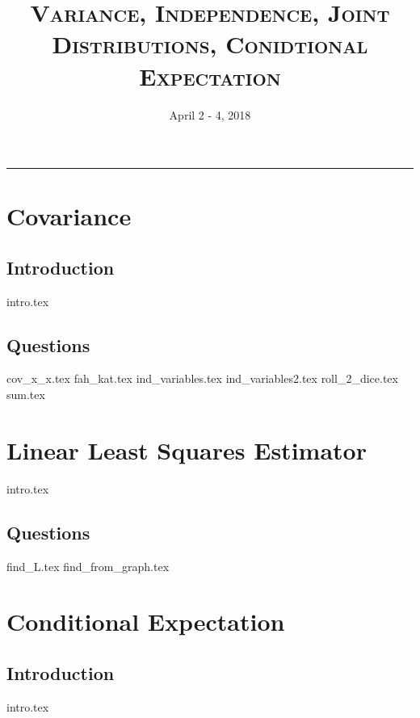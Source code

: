 \documentclass{exam}
\title{\textsc{Variance, Independence, Joint Distributions, Conidtional Expectation}}
\date{April 2 - 4, 2018}
\begin{document}
\maketitle
\rule{\textwidth}{0.15em}
\fontsize{12}{15}\selectfont
\thispagestyle{empty}



\section{Covariance}
\subsection{Introduction}
{intro.tex}
\subsection{Questions}
\begin{questions}
{cov_x_x.tex}
{fah_kat.tex}
{ind_variables.tex}
{ind_variables2.tex}
{roll_2_dice.tex}
{sum.tex}
\end{questions}

\section{Linear Least Squares Estimator}
{intro.tex}
\subsection{Questions}
\begin{questions}
{find_L.tex}
{find_from_graph.tex}
\end{questions}


\section{Conditional Expectation}
\subsection{Introduction}
{intro.tex}
\end{document}
